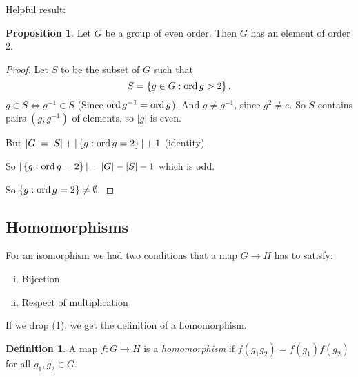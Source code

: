 \documentclass{article}
\theoremstyle{definition} \newtheorem*{definition}{Definition}
\newtheorem{proposition}[theorem]{Proposition}
\begin{document}
Helpful result: \begin{proposition} Let $G$ be a group of even order. Then $G$
  has an element of order 2.  \end{proposition}

\begin{proof} Let $S$ to be the subset of $G$ such that \begin{equation*} S =
    \left\{ g \in G : \operatorname{\text{ord}} g > 2 \right\}.  \end{equation*} $g \in S \iff
  g^{-1} \in S$ (Since $\operatorname{\text{ord}} g^{-1} = \operatorname{\text{ord}} g$). And $g \neq g^{-1}$, since $g^2
  \neq e$. So $S$ contains pairs $(g,g^{-1})$ of elements, so $|g|$ is even. 

  But $|G|=|S| + |\left\{ g : \operatorname{\text{ord}} g=2 \right\}| + 1$ (identity). 

  So $|\left\{ g : \operatorname{\text{ord}} g = 2 \right\}|=|G|-|S|-1$ which is odd. 

  So $\left\{ g : \operatorname{\text{ord}} g = 2 \right\} \neq \emptyset.$

\end{proof}


\subsection{Homomorphisms}

For an isomorphism we had two conditions that a map $G \rightarrow H$ has to
satisfy:

\begin{enumerate}[(i)] \item Bijection \item Respect of multiplication
  \end{enumerate}

If we drop (1), we get the definition of a homomorphism.\\

\begin{definition} A map $f:G \rightarrow H$ is a \emph{homomorphism} if $f(g_1
  g_2)=f(g_1)f(g_2)$ for all $g_1,g_2 \in G.$\\ \end{definition}
\end{document}
